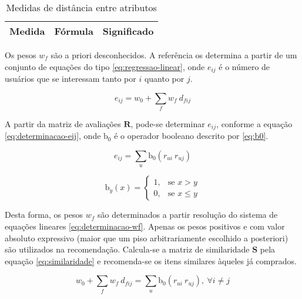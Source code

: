 \begin{table}[hp]
\begin{center}
    \caption{Medidas de distância entre atributos}
    \label{tab:medidas-distancia}
    \begin{tabular}{ | l | c | p{5cm} | }
    \hline
    \textbf{Medida} & \textbf{Fórmula} & \textbf{Significado} \\ \hline
    \end{tabular}
\end{center}
\end{table}
 
Os pesos $w_f$ são a priori desconhecidos. A referência \cite{symeonidis2007feature} os determina a partir de um conjunto de equações do tipo \ref{eq:regressao-linear}, onde $e_{ij}$ é o número de usuários que se interessam tanto por $i$ quanto por $j$. 

\begin{equation}
\label{eq:regressao-linear} 
    e_{ij} = w_0 + \sum_{f}{w_{f} ~ d_{fij}}
\end{equation} 

A partir da matriz de avaliações $\mathbf{R}$, pode-se determinar $e_{ij}$, conforme a equação \ref{eq:determinacao-eij}, onde $\mathrm{b_0}$ é o operador booleano descrito por \ref{eq:b0}.

\begin{equation}
\label{eq:determinacao-eij} 
    e_{ij} = \sum_{u}{\mathrm{b_0}\left(r_{ui} ~ r_{uj}\right)}
\end{equation} 

\begin{equation}
\label{eq:b0}
\mathrm{b}_y\left(x\right) = 
\begin{cases}
1, &\text{se }x>y \\
0, &\text{se }x\leq y
\end{cases} 
\end{equation}

Desta forma, os pesos $w_f$ são determinados a partir resolução do sistema de equações lineares \ref{eq:determinacao-wf}. Apenas os pesos positivos e com valor absoluto expressivo (maior que um piso arbitrariamente escolhido a posteriori) são utilizados na recomendação. Calcula-se a matriz de similaridade $\mathbf{S}$ pela equação \ref{eq:similaridade} e recomenda-se os itens similares àqueles já comprados.  

\begin{equation}
\label{eq:determinacao-wf} 
    w_0 + \sum_{f}{w_{f} ~ d_{fij}} = \sum_{u}{\mathrm{b_0}\left(r_{ui} ~ r_{uj}\right)},~\forall i \neq j 
\end{equation} 

